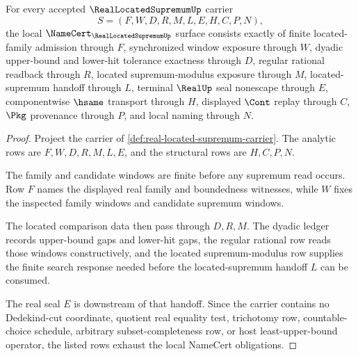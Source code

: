 \begin{theorem}
\label{thm:real-located-supremum-namecert-obligations}
For every accepted $\RealLocatedSupremumUp$ carrier
$$
S=(F,W,D,R,M,L,E,H,C,P,N),
$$
the local $\NameCert_{\RealLocatedSupremumUp}$ surface consists exactly of finite located-family admission through $F$, synchronized window exposure through $W$, dyadic upper-bound and lower-hit tolerance exactness through $D$, regular rational readback through $R$, located supremum-modulus exposure through $M$, located-supremum handoff through $L$, terminal $\RealUp$ seal nonescape through $E$, componentwise $\hsame$ transport through $H$, displayed $\Cont$ replay through $C$, $\Pkg$ provenance through $P$, and local naming through $N$.
\end{theorem}
\begin{proof}
Project the carrier of \autoref{def:real-located-supremum-carrier}. The analytic rows are $F,W,D,R,M,L,E$, and the structural rows are $H,C,P,N$.

The family and candidate windows are finite before any supremum read occurs. Row $F$ names the displayed real family and boundedness witnesses, while $W$ fixes the inspected family windows and candidate supremum windows.

The located comparison data then pass through $D,R,M$. The dyadic ledger records upper-bound gaps and lower-hit gaps, the regular rational row reads those windows constructively, and the located supremum-modulus row supplies the finite search response needed before the located-supremum handoff $L$ can be consumed.

The real seal $E$ is downstream of that handoff. Since the carrier contains no Dedekind-cut coordinate, quotient real equality test, trichotomy row, countable-choice schedule, arbitrary subset-completeness row, or host least-upper-bound operator, the listed rows exhaust the local NameCert obligations.
\end{proof}

